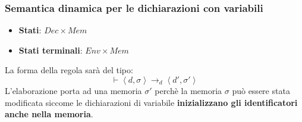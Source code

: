 \documentclass[a4paper]{article}
\begin{document}
\subsubsection{Semantica dinamica per le dichiarazioni con variabili}
\begin{itemize}
  \item \textbf{Stati}: \( Dec \times Mem \) 
  \item \textbf{Stati terminali}: \( Env \times Mem \) 
\end{itemize}
La forma della regola sarà del tipo:
\[
  \vdash \left< d, \sigma \right> \to_d \left< d', \sigma' \right>
\] 
L'elaborazione porta ad una memoria \( \sigma' \) perchè la memoria \( \sigma \) può
essere stata modificata siccome le dichiarazioni di variabile
\textbf{inizializzano gli identificatori anche nella memoria}.
\end{document}
